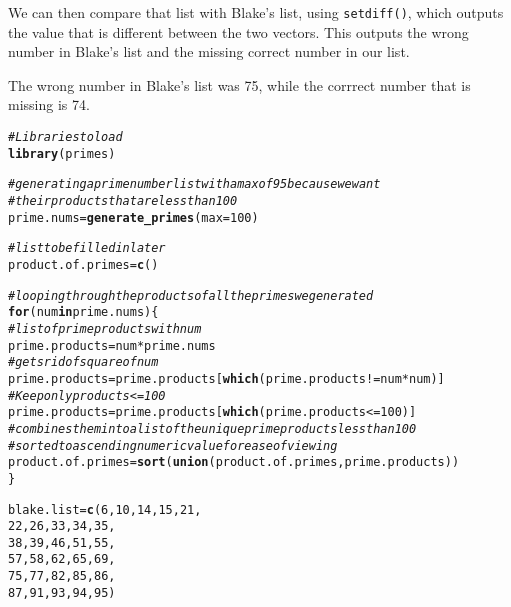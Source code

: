 \documentclass{article}\usepackage[]{graphicx}\usepackage[]{xcolor}
\makeatletter
\newcommand{\hlnum}[1]{\textcolor[rgb]{0.686,0.059,0.569}{#1}}%
\newcommand{\hlcom}[1]{\textcolor[rgb]{0.678,0.584,0.686}{\textit{#1}}}%
\newcommand{\hlopt}[1]{\textcolor[rgb]{0,0,0}{#1}}%
\newcommand{\hldef}[1]{\textcolor[rgb]{0.345,0.345,0.345}{#1}}%
\newcommand{\hlkwa}[1]{\textcolor[rgb]{0.161,0.373,0.58}{\textbf{#1}}}%
\newcommand{\hlkwb}[1]{\textcolor[rgb]{0.69,0.353,0.396}{#1}}%
\newcommand{\hlkwc}[1]{\textcolor[rgb]{0.333,0.667,0.333}{#1}}%
\newcommand{\hlkwd}[1]{\textcolor[rgb]{0.737,0.353,0.396}{\textbf{#1}}}%
\newenvironment{kframe}{%
 \def\at@end@of@kframe{}%
 \ifinner\ifhmode%
  \def\at@end@of@kframe{\end{minipage}}%
  \begin{minipage}{\columnwidth}%
 \fi\fi%
 \def\FrameCommand##1{\hskip\@totalleftmargin \hskip-\fboxsep
 \colorbox{shadecolor}{##1}\hskip-\fboxsep
     \hskip-\linewidth \hskip-\@totalleftmargin \hskip\columnwidth}%
 \MakeFramed {\advance\hsize-\width
   \@totalleftmargin\z@ \linewidth\hsize
   \@setminipage}}%
 {\par\unskip\endMakeFramed%
 \at@end@of@kframe}
\newenvironment{knitrout}{}{} %
\makeatother
\begin{document}
\begin{enumerate}
We can then compare that list with Blake's list, using \texttt{setdiff()}, which outputs the value that is different between the two vectors. This outputs the wrong number in Blake's list and the missing correct number in our list. 

The wrong number in Blake's list was 75, while the corrrect number that is missing is 74.

\begin{knitrout}\scriptsize
{}\color{fgcolor}\begin{kframe}
\begin{alltt}
\hlcom{#Libraries to load}
\hlkwd{library}\hldef{(primes)}

\hlcom{#generating a prime number list with a max of 95 because we want }
\hlcom{#their products that are less than 100}
\hldef{prime.nums} \hlkwb{=} \hlkwd{generate_primes}\hldef{(}\hlkwc{max} \hldef{=} \hlnum{100}\hldef{)}

\hlcom{#list to be filled in later}
\hldef{product.of.primes} \hlkwb{=} \hlkwd{c}\hldef{()}


\hlcom{#looping through the products of all the primes we generated}
\hlkwa{for} \hldef{(num} \hlkwa{in} \hldef{prime.nums)\{}
  \hlcom{#list of prime products with num}
  \hldef{prime.products} \hlkwb{=} \hldef{num}\hlopt{*}\hldef{prime.nums}
  \hlcom{#gets rid of square of num}
  \hldef{prime.products} \hlkwb{=} \hldef{prime.products[}\hlkwd{which}\hldef{(prime.products} \hlopt{!=} \hldef{num}\hlopt{*}\hldef{num)]}
  \hlcom{#Keep only products <= 100}
  \hldef{prime.products} \hlkwb{=} \hldef{prime.products[}\hlkwd{which}\hldef{(prime.products} \hlopt{<=} \hlnum{100}\hldef{)]}
  \hlcom{#combines them into a list of the unique prime products less than 100}
  \hlcom{#sorted to ascending numeric value for ease of viewing}
  \hldef{product.of.primes} \hlkwb{=} \hlkwd{sort}\hldef{(}\hlkwd{union}\hldef{(product.of.primes, prime.products))}
\hldef{\}}


\hldef{blake.list} \hlkwb{=} \hlkwd{c}\hldef{(}\hlnum{6}\hldef{,} \hlnum{10}\hldef{,} \hlnum{14}\hldef{,} \hlnum{15}\hldef{,} \hlnum{21}\hldef{,}
               \hlnum{22}\hldef{,} \hlnum{26}\hldef{,} \hlnum{33}\hldef{,} \hlnum{34}\hldef{,} \hlnum{35}\hldef{,}
               \hlnum{38}\hldef{,} \hlnum{39}\hldef{,} \hlnum{46}\hldef{,} \hlnum{51}\hldef{,} \hlnum{55}\hldef{,}
               \hlnum{57}\hldef{,} \hlnum{58}\hldef{,} \hlnum{62}\hldef{,} \hlnum{65}\hldef{,} \hlnum{69}\hldef{,}
               \hlnum{75}\hldef{,} \hlnum{77}\hldef{,} \hlnum{82}\hldef{,} \hlnum{85}\hldef{,} \hlnum{86}\hldef{,}
               \hlnum{87}\hldef{,} \hlnum{91}\hldef{,} \hlnum{93}\hldef{,} \hlnum{94}\hldef{,} \hlnum{95}\hldef{)}



\end{alltt}
\end{kframe}
\end{knitrout}
\end{enumerate}
\end{document}
